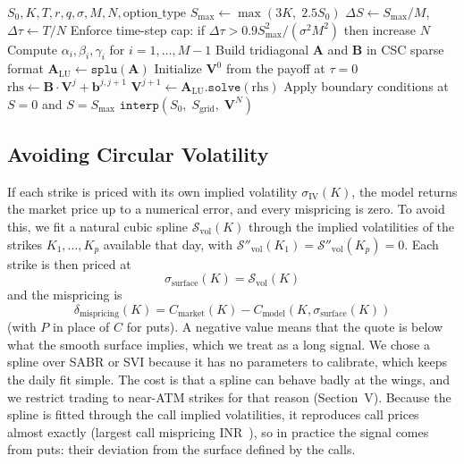 \documentclass[10pt,journal,compsoc]{IEEEtran}
\begin{document}
\begin{algorithm}[htbp]
\caption{Crank-Nicolson PDE Option Pricer with SuperLU}
\label{alg:pde_solver}
\begin{algorithmic}[1]
\REQUIRE $S_0, K, T, r, q, \sigma, M, N, \text{option\_type}$
\STATE $S_{\max} \leftarrow \max(3K,\; 2.5 S_0)$
\STATE $\Delta S \leftarrow S_{\max} / M$, \quad $\Delta \tau \leftarrow T / N$
\STATE Enforce time-step cap: if $\Delta \tau > 0.9 S_{\max}^2 / (\sigma^2 M^2)$ then increase $N$
\STATE Compute $\alpha_i, \beta_i, \gamma_i$ for $i = 1, \dots, M{-}1$
\STATE Build tridiagonal $\mathbf{A}$ and $\mathbf{B}$ in CSC sparse format
\STATE $\mathbf{A}_{\text{LU}} \leftarrow \texttt{splu}(\mathbf{A})$ 
\STATE Initialize $\mathbf{V}^0$ from the payoff at $\tau = 0$
    \STATE $\text{rhs} \leftarrow \mathbf{B} \cdot \mathbf{V}^j + \mathbf{b}^{j,j+1}$
    \STATE $\mathbf{V}^{j+1} \leftarrow \mathbf{A}_{\text{LU}}.\texttt{solve}(\text{rhs})$ 
    \STATE Apply boundary conditions at $S = 0$ and $S = S_{\max}$
\ENDFOR
\RETURN $\texttt{interp}(S_0, \; S_{\text{grid}}, \; \mathbf{V}^N)$
\end{algorithmic}
\end{algorithm}

\subsection{Avoiding Circular Volatility}
If each strike is priced with its own implied volatility $\sigma_{\text{IV}}(K)$, the model returns the market price up to a numerical error, and every mispricing is zero. To avoid this, we fit a natural cubic spline $\mathcal{S}_{\text{vol}}(K)$ through the implied volatilities of the strikes $K_1, \dots, K_p$ available that day, with $\mathcal{S}''_{\text{vol}}(K_1) = \mathcal{S}''_{\text{vol}}(K_p) = 0$. Each strike is then priced at
\begin{equation}
\sigma_{\text{surface}}(K) = \mathcal{S}_{\text{vol}}(K)
\end{equation}
and the mispricing is
\begin{equation}
\delta_{\text{mispricing}}(K) = C_{\text{market}}(K) - C_{\text{model}}\left(K, \sigma_{\text{surface}}(K)\right)
\label{eq:mispricing}
\end{equation}
(with $P$ in place of $C$ for puts). A negative value means that the quote is below what the smooth surface implies, which we treat as a long signal. We chose a spline over SABR or SVI because it has no parameters to calibrate, which keeps the daily fit simple. The cost is that a spline can behave badly at the wings, and we restrict trading to near-ATM strikes for that reason (Section~V). Because the spline is fitted through the call implied volatilities, it reproduces call prices almost exactly (largest call mispricing INR~\LegacyCallMispricingMax), so in practice the signal comes from puts: their deviation from the surface defined by the calls.
\end{document}
